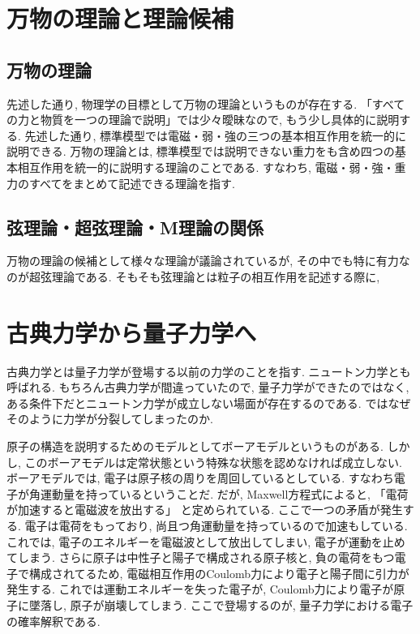 \documentclass{ltjsarticle}
\begin{document}
\section{万物の理論と理論候補}
\subsection{万物の理論}
先述した通り, 物理学の目標として万物の理論というものが存在する. 
「すべての力と物質を一つの理論で説明」では少々曖昧なので, もう少し具体的に説明する. 
先述した通り, 標準模型では電磁・弱・強の三つの基本相互作用を統一的に説明できる. 
万物の理論とは, 標準模型では説明できない重力をも含め四つの基本相互作用を統一的に説明する理論のことである.   
すなわち, 電磁・弱・強・重力のすべてをまとめて記述できる理論を指す. 


\subsection{弦理論・超弦理論・M理論の関係}
万物の理論の候補として様々な理論が議論されているが, その中でも特に有力なのが超弦理論である. 
そもそも弦理論とは粒子の相互作用を記述する際に, 




\section{古典力学から量子力学へ}
古典力学とは量子力学が登場する以前の力学のことを指す. 
ニュートン力学とも呼ばれる. 
もちろん古典力学が間違っていたので, 量子力学ができたのではなく, ある条件下だとニュートン力学が成立しない場面が存在するのである. 
ではなぜそのように力学が分裂してしまったのか. 

原子の構造を説明するためのモデルとしてボーアモデルというものがある. 
しかし, このボーアモデルは定常状態という特殊な状態を認めなければ成立しない. 
ボーアモデルでは, 電子は原子核の周りを周回しているとしている. すなわち電子が角運動量を持っているということだ. 
だが, Maxwell方程式によると, 「電荷が加速すると電磁波を放出する」 と定められている. 
ここで一つの矛盾が発生する. 電子は電荷をもっており, 尚且つ角運動量を持っているので加速もしている. 
これでは, 電子のエネルギーを電磁波として放出してしまい, 電子が運動を止めてしまう. 
さらに原子は中性子と陽子で構成される原子核と, 負の電荷をもつ電子で構成されてるため, 
電磁相互作用のCoulomb力により電子と陽子間に引力が発生する. 
これでは運動エネルギーを失った電子が, Coulomb力により電子が原子に墜落し, 原子が崩壊してしまう. 
ここで登場するのが, 量子力学における電子の確率解釈である. 
\end{document}
